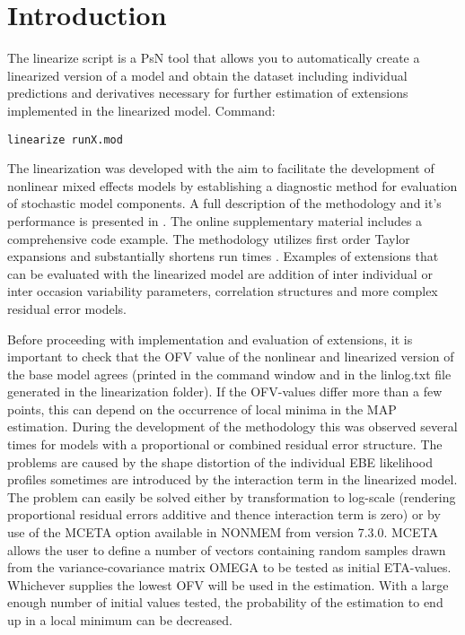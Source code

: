 




\maketitle
\newcommand{\guidetoolname}{linearize}


\section{Introduction}
The linearize script is a PsN tool that allows you to automatically create a linearized version of a model and obtain the dataset including
individual predictions and derivatives necessary for further estimation of extensions implemented in the linearized model. Command:
\begin{verbatim}
linearize runX.mod
\end{verbatim}

\noindent The linearization was developed with the aim to facilitate the development of nonlinear mixed effects models by establishing a 
diagnostic method for evaluation of stochastic model components. A full description of the methodology and it's performance is presented in
\cite{Svensson}. The online supplementary 
material includes a comprehensive code example. 
The methodology utilizes first order Taylor expansions and substantially shortens run times \cite{Khandelwal}. 
Examples of extensions  that can be evaluated with the linearized model are addition of inter individual or inter occasion variability parameters, 
correlation structures and more complex residual error models. 

Before proceeding with implementation and evaluation of extensions, it is important to check that the OFV value of the nonlinear and linearized 
version of the base model agrees (printed in the command window and in the linlog.txt file generated in the linearization folder). 
If the OFV-values differ more than a few points, this can depend on the occurrence of local minima in the MAP estimation. During the development of the methodology 
this was observed several times for models with a proportional or combined residual error structure. The problems are caused by the shape distortion
of the individual EBE likelihood profiles sometimes are introduced by the interaction term in the linearized model. The problem can easily be solved either by
transformation to log-scale (rendering proportional residual errors additive and thence interaction term is zero) or by use of the MCETA option 
available in NONMEM  from version 7.3.0. MCETA allows the user to define a number of vectors containing random samples drawn from the 
variance-covariance matrix OMEGA to be tested as initial ETA-values. Whichever supplies the lowest OFV will be used in the estimation. With a large 
enough number of initial values tested, the probability of the estimation to end up in a local minimum can be decreased.

